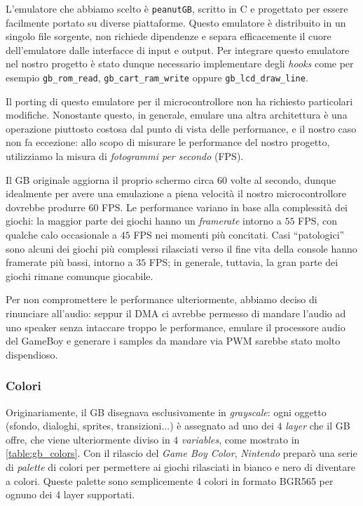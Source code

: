 \documentclass[hidelinks,12pt]{article}
\begin{document}
L'emulatore che abbiamo scelto è \texttt{peanutGB}, scritto in C e progettato
per essere facilmente portato su diverse piattaforme.
Questo emulatore è distribuito in un singolo file sorgente, non richiede
dipendenze e separa efficacemente il cuore dell'emulatore dalle interfacce di
input e output.
Per integrare questo emulatore nel nostro progetto è stato dunque necessario
implementare degli \textit{hooks} come per esempio \texttt{gb\_rom\_read},
\texttt{gb\_cart\_ram\_write} oppure \texttt{gb\_lcd\_draw\_line}.

Il porting di questo emulatore per il microcontrollore non ha richiesto
particolari modifiche. Nonostante questo, in generale, emulare una altra
architettura è una operazione piuttosto costosa dal punto di vista delle
performance, e il nostro caso non fa eccezione: allo scopo di misurare le
performance del nostro progetto, utilizziamo la misura di \textit{fotogrammi
per secondo} (FPS). 

Il GB originale aggiorna il proprio schermo circa 60 volte al secondo, dunque
idealmente per avere una emulazione a piena velocità il nostro microcontrollore
dovrebbe produrre $60$ FPS. Le performance variano in base alla complessità dei
giochi: la maggior parte dei giochi hanno un \textit{framerate} intorno a $55$
FPS, con qualche calo occasionale a $45$ FPS nei momenti più concitati.
Casi ``patologici'' sono alcuni dei giochi più complessi rilasciati verso il
fine vita della console hanno framerate più bassi, intorno a $35$ FPS; 
in generale, tuttavia, la gran parte dei giochi rimane comunque giocabile. 

Per non compromettere le performance ulteriormente, abbiamo deciso di rinunciare
all'audio: seppur il DMA ci avrebbe permesso di mandare l'audio ad uno speaker
senza intaccare troppo le performance, emulare il processore audio del GameBoy e
generare i samples da mandare via PWM sarebbe stato molto dispendioso.

\subsubsection{Colori}
Originariamente, il GB disegnava esclusivamente in \textit{grayscale}: ogni
oggetto (sfondo, dialoghi, sprites, transizioni...) è assegnato ad uno dei $4$
\textit{layer} che il GB offre, che viene ulteriormente diviso in $4$
\textit{variables}, come mostrato in \cref{table:gb_colors}.
Con il rilascio del \textit{Game Boy Color}, \textit{Nintendo} preparò una serie
di \textit{palette} di colori per permettere ai giochi rilasciati in bianco e nero
di diventare a colori. Queste palette sono semplicemente 4 colori in formato BGR565
per ognuno dei 4 layer supportati.
\end{document}
